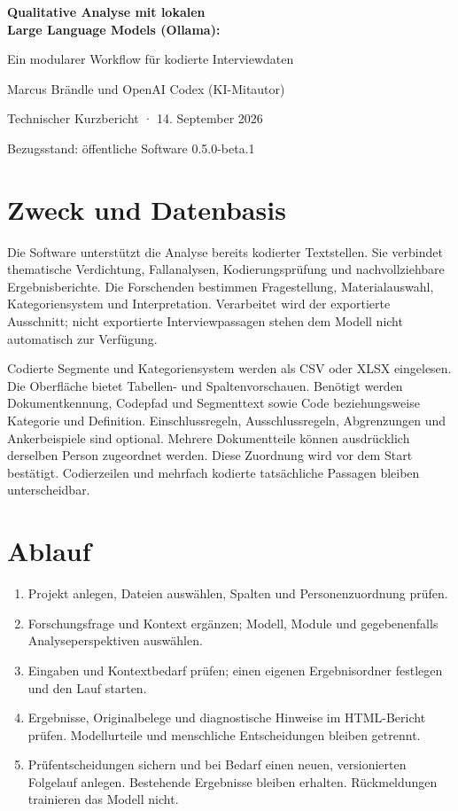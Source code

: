 \documentclass[11pt,a4paper]{article}
\begin{document}
\begin{center}
{\LARGE\bfseries Qualitative Analyse mit lokalen\\Large Language Models (Ollama):\par}
\vspace{4pt}
{\large Ein modularer Workflow für kodierte Interviewdaten\par}
\vspace{7pt}
Marcus Brändle und OpenAI Codex (KI-Mitautor)\par
\vspace{3pt}
{\small Technischer Kurzbericht · 14. September 2026\par
Bezugsstand: öffentliche Software 0.5.0-beta.1\par}
\end{center}

\section*{Zweck und Datenbasis}

Die Software unterstützt die Analyse bereits kodierter Textstellen. Sie verbindet thematische Verdichtung, Fallanalysen, Kodierungsprüfung und nachvollziehbare Ergebnisberichte. Die Forschenden bestimmen Fragestellung, Materialauswahl, Kategoriensystem und Interpretation. Verarbeitet wird der exportierte Ausschnitt; nicht exportierte Interviewpassagen stehen dem Modell nicht automatisch zur Verfügung.

Codierte Segmente und Kategoriensystem werden als CSV oder XLSX eingelesen. Die Oberfläche bietet Tabellen- und Spaltenvorschauen. Benötigt werden Dokumentkennung, Codepfad und Segmenttext sowie Code beziehungsweise Kategorie und Definition. Einschlussregeln, Ausschlussregeln, Abgrenzungen und Ankerbeispiele sind optional. Mehrere Dokumentteile können ausdrücklich derselben Person zugeordnet werden. Diese Zuordnung wird vor dem Start bestätigt. Codierzeilen und mehrfach kodierte tatsächliche Passagen bleiben unterscheidbar.

\section*{Ablauf}

\begin{enumerate}\setlength{\itemsep}{0pt}
\item Projekt anlegen, Dateien auswählen, Spalten und Personenzuordnung prüfen.
\item Forschungsfrage und Kontext ergänzen; Modell, Module und gegebenenfalls Analyseperspektiven auswählen.
\item Eingaben und Kontextbedarf prüfen; einen eigenen Ergebnisordner festlegen und den Lauf starten.
\item Ergebnisse, Originalbelege und diagnostische Hinweise im HTML-Bericht prüfen. Modellurteile und menschliche Entscheidungen bleiben getrennt.
\item Prüfentscheidungen sichern und bei Bedarf einen neuen, versionierten Folgelauf anlegen. Bestehende Ergebnisse bleiben erhalten. Rückmeldungen trainieren das Modell nicht.
\end{enumerate}
\end{document}
